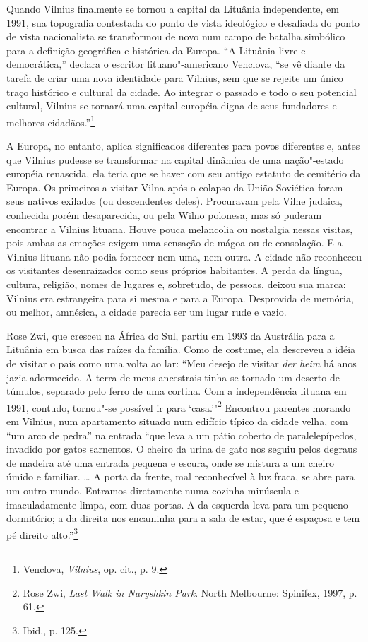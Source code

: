 Quando Vilnius finalmente se tornou a capital da Lituânia independente,
em 1991, sua topografia contestada do ponto de vista ideológico e desafiada do ponto de vista nacionalista se transformou de novo num campo de batalha simbólico para a
definição geográfica e histórica da Europa. ``A Lituânia livre e
democrática,'' declara o escritor lituano"-americano Venclova, ``se vê
diante da tarefa de criar uma nova identidade para Vilnius, sem que se
rejeite um único traço histórico e cultural da cidade. Ao integrar o
passado e todo o seu potencial cultural, Vilnius se tornará uma capital
européia digna de seus fundadores e melhores cidadãos.''\footnote{Venclova,
  \emph{Vilnius}, op. cit., p. 9.}

\asterisc

A Europa, no entanto, aplica significados diferentes para povos
diferentes e, antes que Vilnius pudesse se transformar na capital
dinâmica de uma nação"-estado européia renascida, ela teria que se haver
com seu antigo estatuto de cemitério da Europa. Os primeiros a visitar
Vilna após o colapso da União Soviética foram seus nativos exilados (ou
descendentes deles). Procuravam pela Vilne judaica, conhecida porém
desaparecida, ou pela Wilno polonesa, mas só puderam encontrar a Vilnius
lituana. Houve pouca melancolia ou nostalgia nessas visitas, pois ambas
as emoções exigem uma sensação de mágoa ou de consolação. E a Vilnius
lituana não podia fornecer nem uma, nem outra. A cidade não reconheceu
os visitantes desenraizados como seus próprios habitantes. A perda da
língua, cultura, religião, nomes de lugares e, sobretudo, de pessoas,
deixou sua marca: Vilnius era estrangeira para si mesma e para a Europa.
Desprovida de memória, ou melhor, amnésica, a cidade parecia ser um
lugar rude e vazio.

Rose Zwi, que cresceu na África do Sul, partiu em 1993 da Austrália para
a Lituânia em busca das raízes da família. Como de costume, ela
descreveu a idéia de visitar o país como uma volta ao lar: ``Meu desejo
de visitar \emph{der heim} há anos jazia adormecido. A terra de meus
ancestrais tinha se tornado um deserto de túmulos, separado pelo ferro
de uma cortina. Com a independência lituana em 1991, contudo, tornou"-se
possível ir para `casa.'"\footnote{Rose Zwi, \emph{Last Walk in
  Naryshkin Park}. North Melbourne: Spinifex, 1997, p. 61.} Encontrou
parentes morando em Vilnius, num apartamento situado num edifício típico
da cidade velha, com ``um arco de pedra'' na entrada ``que leva a um
pátio coberto de paralelepípedos, invadido por gatos sarnentos. O cheiro
da urina de gato nos seguiu pelos degraus de madeira até uma entrada
pequena e escura, onde se mistura a um cheiro úmido e familiar. \ldots{}
A porta da frente, mal reconhecível à luz fraca, se abre para um outro
mundo. Entramos diretamente numa cozinha minúscula e imaculadamente
limpa, com duas portas. A da esquerda leva para um pequeno dormitório; a
da direita nos encaminha para a sala de estar, que é espaçosa e tem pé
direito alto.''\footnote{Ibid., p. 125.}

